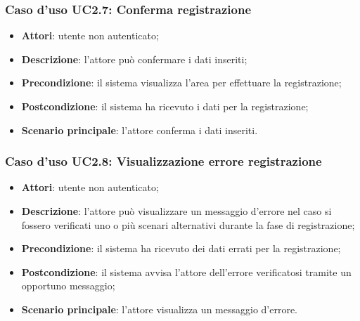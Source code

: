 \subsubsection{Caso d'uso UC2.7: Conferma registrazione}
\begin{itemize}
\item \textbf{Attori}: utente non autenticato;
\item \textbf{Descrizione}: l'attore può confermare i dati inseriti;
\item \textbf{Precondizione}: il sistema visualizza l'area per effettuare la registrazione;
\item \textbf{Postcondizione}: il sistema ha ricevuto i dati per la registrazione;
\item \textbf{Scenario principale}: l'attore conferma i dati inseriti.
\end{itemize}

\subsubsection{Caso d'uso UC2.8: Visualizzazione errore registrazione}
\begin{itemize}
\item \textbf{Attori}: utente non autenticato;
\item \textbf{Descrizione}: l'attore può visualizzare un messaggio d'errore nel caso si fossero verificati uno o più scenari alternativi durante la fase di registrazione;
\item \textbf{Precondizione}: il sistema ha ricevuto dei dati errati per la registrazione;
\item \textbf{Postcondizione}: il sistema avvisa l'attore dell'errore verificatosi tramite un opportuno messaggio;
\item \textbf{Scenario principale}: l'attore visualizza un messaggio d'errore.
\end{itemize}
